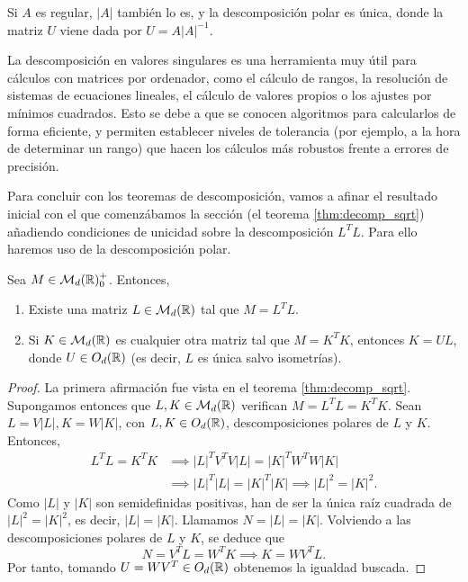 \begin{remark}
    Si $A$ es regular, $|A|$ también lo es, y la descomposición polar es única, donde la matriz $U$ viene dada por $U = A|A|^{-1}$.
\end{remark}

La descomposición en valores singulares es una herramienta muy útil para cálculos con matrices por ordenador, como el cálculo de rangos, la resolución de sistemas de ecuaciones lineales, el cálculo de valores propios o los ajustes por mínimos cuadrados. Esto se debe a que se conocen algoritmos para calcularlos de forma eficiente, y permiten establecer niveles de tolerancia (por ejemplo, a la hora de determinar un rango) que hacen los cálculos más robustos frente a errores de precisión.

Para concluir con los teoremas de descomposición, vamos a afinar el resultado inicial con el que comenzábamos la sección (el teorema \ref{thm:decomp_sqrt}) añadiendo condiciones de unicidad sobre la descomposición $L^TL$. Para ello haremos uso de la descomposición polar.

\begin{thm} \label{thm:psd_decomposition}
    Sea $M \in \mathcal{M}_d(\mathbb{R})^+_0$. Entonces,
    \begin{enumerate}
        \item Existe una matriz $L \in \mathcal{M}_d(\mathbb{R})$ tal que $M = L^TL$.
        \item Si $K \in \mathcal{M}_d(\mathbb{R})$ es cualquier otra matriz tal que $M = K^TK$, entonces $K = UL$, donde $U \in O_d(\mathbb{R})$ (es decir, $L$ es única salvo isometrías).
    \end{enumerate}
\end{thm}

\begin{proof}
    La primera afirmación fue vista en el teorema \ref{thm:decomp_sqrt}. Supongamos entonces que $L, K \in \mathcal{M}_d(\mathbb{R})$ verifican $M = L^TL = K^TK$. Sean $L = V|L|, K = W|K|$, con $L, K \in O_d(\mathbb{R})$, descomposiciones polares de $L$ y $K$. Entonces,
    \begin{align*}
        L^TL = K^TK &\implies |L|^TV^TV|L| = |K|^TW^TW|K| \\
                    &\implies |L|^T|L| = |K|^T|K| \implies |L|^2 = |K|^2.
    \end{align*}
    Como $|L|$ y $|K|$ son semidefinidas positivas, han de ser la única raíz cuadrada de $|L|^2 = |K|^2$, es decir, $|L|=|K|$. Llamamos $N = |L| = |K|$. Volviendo a las descomposiciones polares de $L$ y $K$, se deduce que
    \[ N = V^TL = W^TK \implies K = WV^TL. \]
    Por tanto, tomando $U = WV^T \in O_d(\mathbb{R})$ obtenemos la igualdad buscada.
\end{proof}

